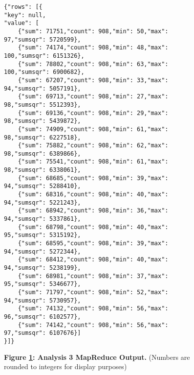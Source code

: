 \begin{figure}[H]
    \centering
    \begin{mdframed}
        \centering
        \begin{verbatim}
{"rows": [{
"key": null,    
"value": [
    {"sum": 71751,"count": 908,"min": 50,"max": 97,"sumsqr": 5720599},
    {"sum": 74174,"count": 908,"min": 48,"max": 100,"sumsqr": 6151326},
    {"sum": 78802,"count": 908,"min": 63,"max": 100,"sumsqr": 6900682},
    {"sum": 67207,"count": 908,"min": 33,"max": 94,"sumsqr": 5057191},
    {"sum": 69713,"count": 908,"min": 27,"max": 98,"sumsqr": 5512393},
    {"sum": 69136,"count": 908,"min": 29,"max": 98,"sumsqr": 5439872},
    {"sum": 74909,"count": 908,"min": 61,"max": 98,"sumsqr": 6227518},
    {"sum": 75882,"count": 908,"min": 62,"max": 98,"sumsqr": 6389866},
    {"sum": 75541,"count": 908,"min": 61,"max": 98,"sumsqr": 6338061},
    {"sum": 68685,"count": 908,"min": 39,"max": 94,"sumsqr": 5288410},
    {"sum": 68316,"count": 908,"min": 40,"max": 94,"sumsqr": 5221243},
    {"sum": 68942,"count": 908,"min": 36,"max": 94,"sumsqr": 5337861},
    {"sum": 68798,"count": 908,"min": 40,"max": 95,"sumsqr": 5315192},
    {"sum": 68595,"count": 908,"min": 39,"max": 94,"sumsqr": 5272344},
    {"sum": 68412,"count": 908,"min": 40,"max": 94,"sumsqr": 5238199},
    {"sum": 68981,"count": 908,"min": 37,"max": 95,"sumsqr": 5346677},
    {"sum": 71797,"count": 908,"min": 52,"max": 94,"sumsqr": 5730957},
    {"sum": 74132,"count": 908,"min": 56,"max": 96,"sumsqr": 6102577},
    {"sum": 74142,"count": 908,"min": 56,"max": 97,"sumsqr": 6107676}]
}]}      
        \end{verbatim}
    \end{mdframed}
    \caption[Analysis 3 MapReduce Output]{\textbf{Figure \ref{fig-variance-reduce-output}: Analysis 3 MapReduce Output.} (Numbers are rounded to integers for display purposes)}
    \label{fig-variance-reduce-output}
\end{figure}
